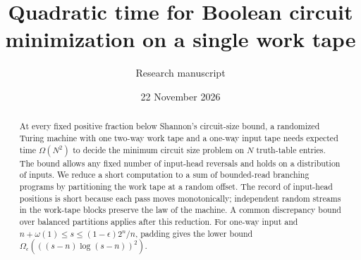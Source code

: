 \documentclass[11pt]{article}
\title{Quadratic time for Boolean circuit minimization on a single work tape}
\author{Research manuscript}\date{22 November 2026}
\begin{document}
\maketitle
\begin{abstract}
At every fixed positive fraction below Shannon's circuit-size bound, a randomized Turing machine with one two-way work tape and a one-way input tape needs expected time $\Omega(N^2)$ to decide the minimum circuit size problem on $N$ truth-table entries. The bound allows any fixed number of input-head reversals and holds on a distribution of inputs. We reduce a short computation to a sum of bounded-read branching programs by partitioning the work tape at a random offset. The record of input-head positions is short because each pass moves monotonically; independent random streams in the work-tape blocks preserve the law of the machine. A common discrepancy bound over balanced partitions applies after this reduction. For one-way input and $n+\omega(1)\le s\le(1-\epsilon)2^n/n$, padding gives the lower bound $\Omega_\epsilon(((s-n)\log(s-n))^2)$.
\end{abstract}
\end{document}
